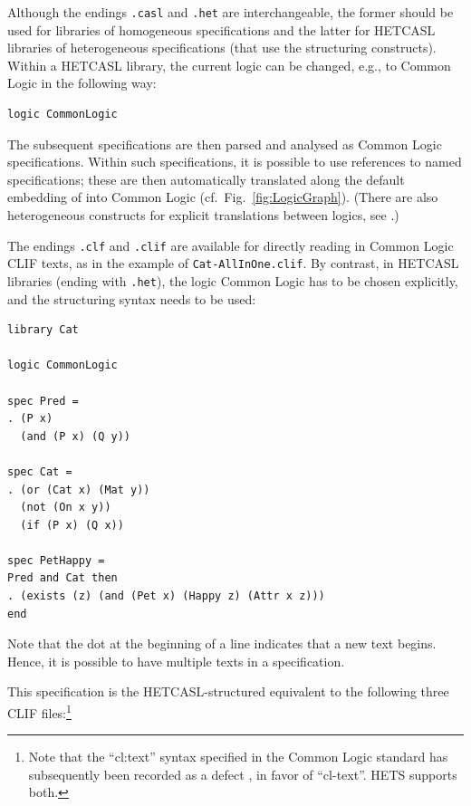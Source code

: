 \documentclass{article}
\newcommand{\normalTEXTSC}[2]{{#1\scriptsize#2}}
\newcommand     {\Hets}{\normalTEXTSC{H}{ETS}\xspace}
\newcommand{\HetCASL}{\normalTEXTSC{H}{ET}\normalTEXTSC{C}{ASL}\xspace}
\begin{document}
\medskip

Although the endings \texttt{.casl} and \texttt{.het} are
interchangeable, the former should be used for libraries of
homogeneous \CASL specifications and the latter for \HetCASL libraries
of heterogeneous specifications (that use the \CASL structuring
constructs). Within a \HetCASL library, the current logic can be changed, e.g.,
to Common Logic in the following way:

\begin{lstlisting}[morekeywords=logic]
logic CommonLogic
\end{lstlisting}

The subsequent specifications are then parsed and analysed as
Common Logic specifications. Within such specifications,
it is possible to use references to named \CASL specifications;
these are then automatically translated along the default
embedding of \CASL into Common Logic (cf.\ Fig.~\ref{fig:LogicGraph}).
(There are also heterogeneous constructs
for explicit translations between logics, see \cite{Mossakowski04}.)

The endings \texttt{.clf} and \texttt{.clif} are available for directly reading in
Common Logic CLIF texts, as in the example of \texttt{Cat-AllInOne.clif}.
By contrast, in \HetCASL libraries (ending with \texttt{.het}),
the logic Common Logic has to be chosen explicitly, and the \CASL structuring
syntax needs to be used:

\begin{lstlisting}[language=hetcasl,alsolanguage=clif]
library Cat

logic CommonLogic

spec Pred = 
. (P x)
  (and (P x) (Q y))

spec Cat =
. (or (Cat x) (Mat y))
  (not (On x y))
  (if (P x) (Q x))

spec PetHappy =
Pred and Cat then
. (exists (z) (and (Pet x) (Happy z) (Attr x z)))
end
\end{lstlisting}

Note that the dot at the beginning of a line indicates that a new text begins.
Hence, it is possible to have multiple texts in a \CASL specification.

This specification is the \HetCASL-structured equivalent to the following three
CLIF files:\footnote{Note that the ``cl:text'' syntax specified in the Common Logic standard \cite{CommonLogic:oldfashioned} has subsequently been recorded as a defect \cite{CommonLogicDefects:oldfashioned}, in favor of ``cl-text''.  \Hets supports both.}\\
\end{document}
